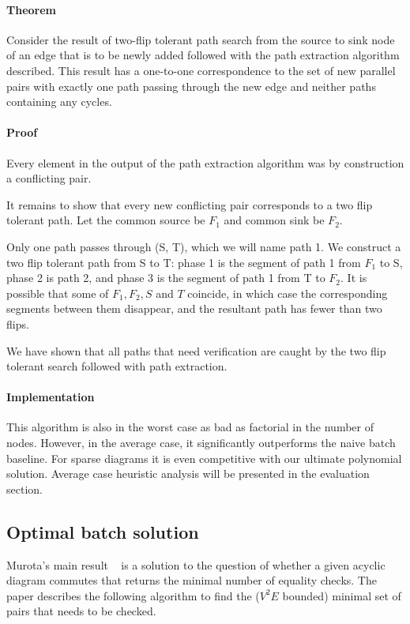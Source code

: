 \documentclass[sigplan,review,anonymous]{acmart}
\begin{document}
\paragraph{Theorem} Consider the result of two-flip tolerant path search from the source to sink node of an edge that is to be newly added followed with the path extraction algorithm described.  This result has a one-to-one correspondence to the set of new parallel pairs with exactly one path passing through the new edge and neither paths containing any cycles.

\paragraph{Proof}

Every element in the output of the path extraction algorithm was by construction a conflicting pair.

It remains to show that every new conflicting pair corresponds to a two flip tolerant path. Let the common source be $F_1$ and common sink be $F_2$. 

Only one path passes through (S, T), which we will name path 1. We construct a two flip tolerant path from S to T: phase 1 is the segment of path 1 from $F_1$ to S, phase 2 is path 2, and phase 3 is the segment of path 1 from T to $F_2$. It is possible that some of $F_1, F_2, S$ and $T$ coincide, in which case the corresponding segments between them disappear, and the resultant path has fewer than two flips.

We have shown that all paths that need verification are caught by the two flip tolerant search followed with path extraction.

\paragraph{Implementation}

This algorithm is also in the worst case as bad as factorial in the number of nodes. However, in the average case, it significantly outperforms the naive batch baseline. For sparse diagrams it is even competitive with our ultimate polynomial solution. Average case heuristic analysis will be presented in the evaluation section.

\subsection{Optimal batch solution}
Murota's main result ~\cite{commutative} is a solution to the question of whether a given acyclic diagram commutes that returns the minimal number of equality checks. The paper describes the following algorithm to find the ($V^2E$ bounded) minimal set of pairs that needs to be checked.
\end{document}
